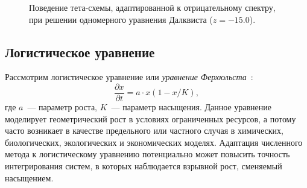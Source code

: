 \begin{figure}
    \centering
    \caption{Поведение тета-схемы, адаптированной к отрицательному спектру, при решении одномерного уравнения Далквиста ($ z = -15.0 $).}
    \label{fig:one_dimensional_linear_system:Dahlquist_optimal_theta_method_2}
\end{figure}

\FloatBarrier


\subsection{Логистическое уравнение}
\label{subsection:methods:logistic_differential_equation}

Рассмотрим логистическое уравнение или \emph{уравнение Ферхюльста}~\cite{verhulst1838logistic_equation, cramer2002origins_of_logistic_regression}:
\begin{equation}
    \label{eq:logistic_differential_equation:logistic_differential_equation}
    \frac{\partial x}{\partial t} = a \cdot x (1 - x / K),
\end{equation}
где $ a $~--- параметр роста, $ K $~--- параметр насыщения.
Данное уравнение моделирует геометрический рост в условиях ограниченных ресурсов,
а потому часто возникает в качестве предельного или частного случая в химических,
биологических, экологических и экономических моделях.
Адаптация численного метода к логистическому уравнению потенциально может повысить точность интегрирования систем,
в которых наблюдается взрывной рост, сменяемый насыщением.

